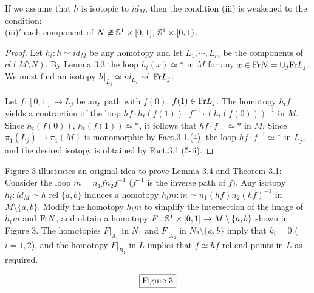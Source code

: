\documentclass[11pt]{amsart}
\theoremstyle{definition}
\newtheorem*{Proof of Theorem 3.1}{Proof of Theorem 3.1}
\newtheorem*{Proof of Corollary 3.1}{Proof of Corollary 3.1}
\newtheorem*{Proof of Proposition 4.1.(1)}{Proof of Proposition 4.1.(1)}
\newtheorem*{Proof of Proposition 4.1.(2)}{Proof of Proposition 4.1.(2)}
\newtheorem*{Proof of Corollary 1.1}{Proof of Corollary 1.1}
\begin{document}
If we assume that $h$ is isotopic to $id_M$, then the condition (iii) is weakened to the condition: \\
(iii)$'$ each component of $N \not\cong {\Bbb S}^1 \times [0, 1]$, ${\Bbb S}^1 \times [0, 1)$. 

\begin{proof}
Let $h_t : h \simeq id_M$ be any homotopy and let $L_1, \cdots, L_m$ be the components of $cl(M \setminus N)$. By Lemma 3.3 the loop $h_t(x) \simeq \ast$ in $M$ for any $x \in {\rm Fr}N = \cup_j {\rm Fr}L_j$. We must find an isotopy $h|_{L_j} \simeq id_{L_j}$ rel ${\rm Fr}L_j$. 

Let $f : [0, 1] \to L_j$ be any path with $f(0)$, $f(1) \in {\rm Fr}L_j$. The homotopy $h_tf$ yields a contraction of the loop $hf \cdot h_t(f(1)) \cdot f^{-1} \cdot (h_t(f(0)))^{-1}$ in $M$. Since $h_t(f(0))$, $h_t(f(1)) \simeq \ast$, it follows that $hf \cdot f^{-1} \simeq \ast$ in $M$. Since $\pi_1(L_j) \to \pi_1(M)$ is monomorphic by Fact.3.1.(4), the loop $hf \cdot f^{-1} \simeq \ast$ in $L_j$, and the desired isotopy is obtained by Fact.3.1.(5-ii).
\end{proof}

Figure 3 illustrates an original idea to prove Lemma 3.4 and Theorem 3.1: Consider the loop $m = n_1 f n_2 f^{-1}$ ($f^{-1}$ is the inverse path of $f$). Any isotopy $h_t : id_M \simeq h$ rel $\{ a, b \}$ induces a homotopy $h_t m : m \simeq n_1 (hf) n_2 (hf)^{-1}$ in $M \setminus \{ a, b \}$. Modify the homotopy $h_t m$ to simplify the intersection of the image of $h_t m$ and ${\rm Fr}N$, and  obtain a homotopy $F : {\Bbb S}^1 \times [0,1] \to M \setminus \{ a, b \}$ shown in Figure 3. The homotopies $F|_{A_1}$ in $N_1$ and $F|_{A_2}$ in $N_2 \setminus \{ a, b \}$ imply that $k_i = 0$ ($i = 1, 2$), and the homotopy $F|_{B_1}$ in $L$ implies that $f \simeq hf$ rel end points in $L$ as required. 

\begin{figure}[h]
\caption{}
\[ \fbox{Figure 3} \]
\end{figure}
\end{document}
